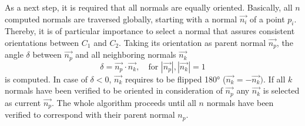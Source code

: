 As a next step, it is required that all normals are equally oriented. Basically, all $n$ computed normals are traversed globally, starting with a normal $\vec{n_i}$ of a point $p_i$. Thereby, it is of particular importance to select a normal that assures consistent orientations between $C_1$ and $C_2$. Taking its orientation as parent normal $\vec{n_p}$, the angle $\delta$ between $\vec{n_p}$ and all neighboring normals $\vec{n_k}$ 
\begin{equation}
\delta = \vec{n_p} \cdot \vec{n_k}, \quad \text{for $|\vec{n_p}|, |\vec{n_k}| = 1$}
\end{equation}
is computed. In case of $\delta < 0$, $\vec{n_k}$ requires to be flipped 180° ($\vec{n_k} = -\vec{n_k})$. If all $k$ normals have been verified to be oriented in consideration of $\vec{n_p}$ any $\vec{n_k}$ is selected as current $\vec{n_p}$. The whole algorithm proceeds until all $n$ normals have been verified to correspond with their parent normal $n_p$.


